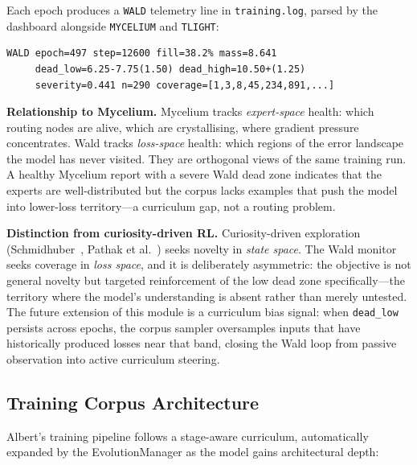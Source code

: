 \documentclass[journal,10pt,twocolumn]{IEEEtran}
\begin{document}
Each epoch produces a \texttt{WALD} telemetry line in \texttt{training.log},
parsed by the dashboard alongside \texttt{MYCELIUM} and \texttt{TLIGHT}:

\begin{lstlisting}[basicstyle=\ttfamily\footnotesize]
WALD epoch=497 step=12600 fill=38.2% mass=8.641
     dead_low=6.25-7.75(1.50) dead_high=10.50+(1.25)
     severity=0.441 n=290 coverage=[1,3,8,45,234,891,...]
\end{lstlisting}

\textbf{Relationship to Mycelium.} Mycelium tracks \emph{expert-space} health:
which routing nodes are alive, which are crystallising, where gradient pressure
concentrates. Wald tracks \emph{loss-space} health: which regions of the error
landscape the model has never visited. They are orthogonal views of the same
training run. A healthy Mycelium report with a severe Wald dead zone indicates
that the experts are well-distributed but the corpus lacks examples that push
the model into lower-loss territory---a curriculum gap, not a routing problem.

\textbf{Distinction from curiosity-driven RL.} Curiosity-driven exploration
(Schmidhuber~\cite{schmidhuber1991}, Pathak et al.~\cite{pathak2017}) seeks
novelty in \emph{state space}. The Wald monitor seeks coverage in \emph{loss
space}, and it is deliberately asymmetric: the objective is not general novelty
but targeted reinforcement of the low dead zone specifically---the territory
where the model's understanding is absent rather than merely untested. The
future extension of this module is a curriculum bias signal: when
\texttt{dead\_low} persists across epochs, the corpus sampler oversamples
inputs that have historically produced losses near that band, closing the Wald
loop from passive observation into active curriculum steering.

\subsection{Training Corpus Architecture}

Albert's training pipeline follows a stage-aware curriculum, automatically
expanded by the EvolutionManager as the model gains architectural depth:
\end{document}
